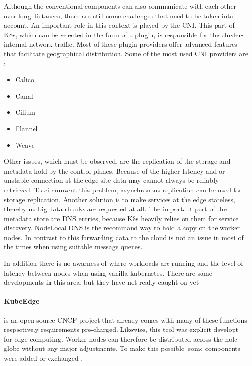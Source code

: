 \documentclass[MSC,Master,english]{twbook}%
\begin{document}
Although the conventional components can also communicate with each other over long distances, there are still some challenges that need to be taken into account. An important role in this context is played by the \ac{CNI}. This part of \ac{K8s}, which can be selected in the form of a plugin, is responsible for the cluster-internal network traffic. Most of these plugin providers offer advanced features that facilitate geographical distribution. Some of the most used \ac{CNI} providers are \cite{k8s-cni}:

\begin{itemize}
    \item Calico
    \item Canal
    \item Cilium
    \item Flannel
    \item Weave
\end{itemize}

Other issues, which must be observed, are the replication of the storage and metadata hold by the control planes. Because of the higher latency and-or unstable connection at the edge site data may cannot always be reliably retrieved. To circumvent this problem, asynchronous replication can be used for storage replication. Another solution is to make services at the edge stateless, thereby no big data chunks are requested at all. The important part of the metadata store are \ac{DNS} entries, because \ac{K8s} heavily relies on them for service discovery. NodeLocal DNS is the recommand way \cite{k8sdnslocal} to hold a copy on the worker nodes. In contrast to this forwarding data to the cloud is not an issue in most of the times when using suitable message queues.  

In addition there is no awarness of where workloads are running and the level of latency between nodes when using vanilla kubernetes. There are some developments in this area, but they have not really caught on yet \cite{k8s-sharping-edge}\cite{tk-k8s-edge-scheduler}\cite{5g-k8s-scheduler}.

\paragraph{KubeEdge} is an open-source \ac{CNCF} project \cite{hal-kubeedge} that already comes with many of these functions respectively requirements pre-charged. Likewise, this tool was explicit developt for edge-computing.  Worker nodes can therefore be distributed across the hole globe without any major adjustments. To make this possible, some components were added or exchanged \cite{kubedge}.
\end{document}
